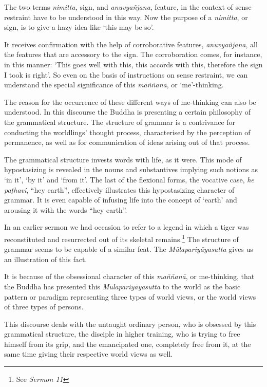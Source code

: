 The two terms \emph{nimitta,} sign, and \emph{anuvyañjana}, feature, in the context of sense restraint have to be understood in this way. Now the purpose of a \emph{nimitta}, or sign, is to give a hazy idea like `this may be so'.

It receives confirmation with the help of corroborative features, \emph{anuvyañjana}, all the features that are accessory to the sign. The corroboration comes, for instance, in this manner: `This goes well with this, this accords with this, therefore the sign I took is right'. So even on the basis of instructions on sense restraint, we can understand the special significance of this \emph{maññanā}, or `me'-thinking.

The reason for the occurrence of these different ways of me-thinking can also be understood. In this discourse the Buddha is presenting a certain philosophy of the grammatical structure. The structure of grammar is a contrivance for conducting the worldlings' thought process, characterised by the perception of permanence, as well as for communication of ideas arising out of that process.

The grammatical structure invests words with life, as it were. This mode of hypostasizing is revealed in the nouns and substantives implying such notions as `in it', `by it' and `from it'. The last of the flexional forms, the vocative case, \emph{he paṭhavi}, ``hey earth'', effectively illustrates this hypostasizing character of grammar. It is even capable of infusing life into the concept of `earth' and arousing it with the words ``hey earth''.

In an earlier sermon we had occasion to refer to a legend in which a tiger was reconstituted and resurrected out of its skeletal remains.\footnote{See \emph{Sermon 11}} The structure of grammar seems to be capable of a similar feat. The \emph{Mūlapariyāyasutta} gives us an illustration of this fact.

It is because of the obsessional character of this \emph{maññanā}, or me-thinking, that the Buddha has presented this \emph{Mūlapariyāyasutta} to the world as the basic pattern or paradigm representing three types of world views, or the world views of three types of persons.

This discourse deals with the untaught ordinary person, who is obsessed by this grammatical structure, the disciple in higher training, who is trying to free himself from its grip, and the emancipated one, completely free from it, at the same time giving their respective world views as well.

